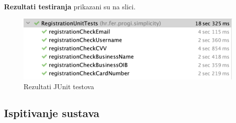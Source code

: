         \textbf{Rezultati testiranja}{ prikazani su na slici.}
        \begin{figure}[H]
			    \includegraphics[width=\textwidth]{slike/TestoviKomponentiRezultat.png} 
			        \caption{Rezultati JUnit testova}
			    \label{fig:Rezultati JUnit testova}
		\end{figure}
			
			
			\subsection{Ispitivanje sustava}


